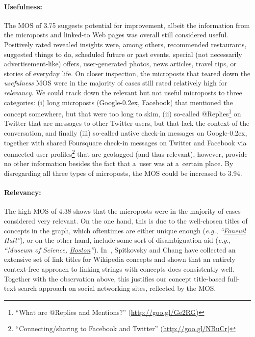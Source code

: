 \documentclass[runningheads,a4paper]{llncs}
\newcommand{\googleplus}{Google\nolinebreak\hspace{0em}\raisebox{.28ex}{\tiny\bf +}\kern-0.2ex\xspace}
\begin{document}
\paragraph{Usefulness:}
The MOS of 3.75 suggests potential for improvement,
albeit the information from the microposts and linked-to Web pages
was overall still considered useful.
Positively rated revealed insights were, among others, recommended restaurants,
suggested things to do, scheduled future or past events,
special (not necessarily advertisement-like) offers, user-generated photos,
news articles, travel tips, or stories of everyday life.
On closer inspection, the microposts that teared down the \emph{usefulness} MOS
were in the majority of cases still rated relatively high for \emph{relevancy}.
We could track down the relevant but not useful microposts to three categories:
(i) long microposts (\googleplus, Facebook) that mentioned the concept somewhere,
but that were too long to skim,
(ii) so-called
@Replies\footnote{``What are @Replies and Mentions?'' (\url{http://goo.gl/Ge2RG})}
on Twitter that are messages to other Twitter users,
but that lack the context of the conversation, and finally
(iii) so-called native check-in messages on \googleplus,
together with shared Foursquare check-in messages on Twitter and Facebook
via connected user profiles\footnote{``Connecting/sharing to Facebook and Twitter'' (\url{http://goo.gl/NBuCr})}
that are geotagged (and thus relevant), however,
provide no other information besides the fact that a~user was at a~certain place.
By disregarding all three types of microposts, the MOS could be increased to 3.94.

\paragraph{Relevancy:} \label{sec:relevancy}
The high MOS of 4.38 shows that the microposts
were in the majority of cases considered very relevant.
On the one hand, this is due to the well-chosen titles of concepts in the graph,
which oftentimes are either unique enough (\emph{e.g.}, \emph{``\underline{Faneuil} Hall''}),
or on the other hand, include some sort of disambiguation aid
(\emph{e.g.}, \emph{``Museum of Science, \underline{Boston}''}).
In~\cite{spitkovsky2012}, Spitkovsky and Chang have collected
an extensive set of link titles for Wikipedia concepts
and shown that an entirely context-free approach
to linking strings with concepts does consistently well.
Together with the observation above, this justifies
our concept title-based full-text search approach on social networking sites,
reflected by the MOS.
\end{document}
